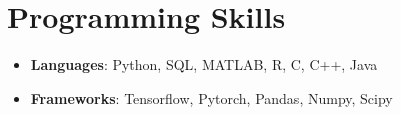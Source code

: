 \documentclass[letterpaper,12pt]{article}
\newcommand{\resumeItem}[2]{
  \item\small{
    \textbf{#1}{: #2 \vspace{-2pt}}
  }
}
\newcommand{\resumeSubItem}[2]{\resumeItem{#1}{#2}\vspace{-4pt}}
\newcommand{\resumeSubHeadingListStart}{\begin{itemize}[leftmargin=*, label={}]}
\newcommand{\resumeSubHeadingListEnd}{\end{itemize}}
\begin{document}
%
\section{Programming Skills}
\resumeSubHeadingListStart

\resumeSubItem{Languages}{Python, SQL, MATLAB, R, C, C++, Java}

\resumeSubItem{Frameworks}{Tensorflow, Pytorch, Pandas, Numpy, Scipy}

\resumeSubHeadingListEnd




\end{document}
